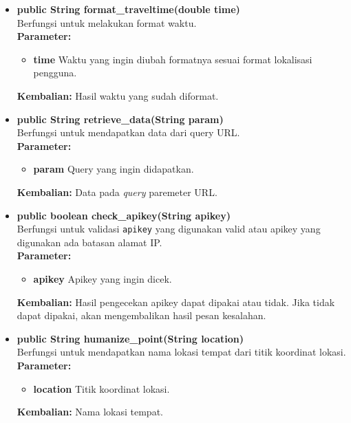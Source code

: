 \begin{enumerate}
\begin{itemize}
		\item \textbf{public String format\_traveltime(double time)}\\
		Berfungsi untuk melakukan format waktu.\\
		\textbf{Parameter:}
				\begin{itemize}
					\item \textbf{time} Waktu yang ingin diubah formatnya sesuai format lokalisasi pengguna.
				\end{itemize}
		\textbf{Kembalian:}  Hasil waktu yang sudah diformat.
		
		\item \textbf{public String retrieve\_data(String param)}\\
		Berfungsi untuk mendapatkan data dari query URL.\\
		\textbf{Parameter:}
				\begin{itemize}
					\item \textbf{param} Query yang ingin didapatkan.
				\end{itemize}
		\textbf{Kembalian:}  Data pada \textit{query} paremeter URL.
		
		\item \textbf{public boolean check\_apikey(String apikey)}\\
		Berfungsi untuk validasi \verb!apikey! yang digunakan valid atau apikey yang digunakan ada batasan alamat IP.\\
		\textbf{Parameter:}
				\begin{itemize}
					\item \textbf{apikey} Apikey yang ingin dicek.
				\end{itemize}
		\textbf{Kembalian:}  Hasil pengecekan apikey dapat dipakai atau tidak. Jika tidak dapat dipakai, akan mengembalikan hasil pesan kesalahan.
		
		\item \textbf{public String humanize\_point(String location)}\\
		Berfungsi untuk mendapatkan nama lokasi tempat dari titik koordinat lokasi.\\
		\textbf{Parameter:}
				\begin{itemize}
					\item \textbf{location} Titik koordinat lokasi.
				\end{itemize}
		\textbf{Kembalian:}  Nama lokasi tempat.
		

\end{itemize}
\end{enumerate}
